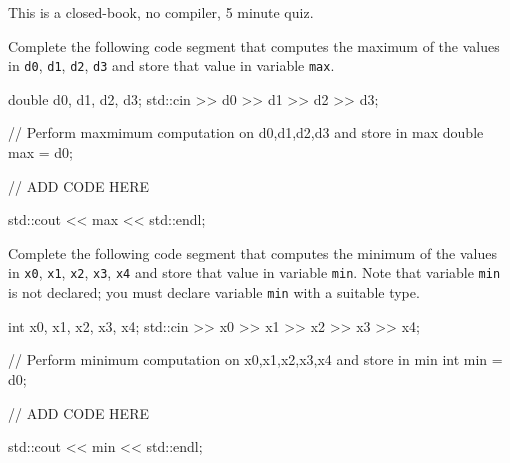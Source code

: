 

This is a closed-book, no compiler, 5 minute quiz.

\nextq
Complete the following code segment that computes the maximum of the values in
\verb!d0!, \verb!d1!, \verb!d2!, \verb!d3!
and store that value in variable \verb!max!.
\\
\ANSWER
\begin{answercode}
double d0, d1, d2, d3;
std::cin >> d0 >> d1 >> d2 >> d3;

// Perform maxmimum computation on d0,d1,d2,d3 and store in max
double max = d0;

// ADD CODE HERE

std::cout << max << std::endl;
\end{answercode}

\nextq
Complete the following code segment that computes the minimum of the values in
\verb!x0!, \verb!x1!, \verb!x2!, \verb!x3!, \verb!x4!
and store that value in variable \verb!min!.
Note that variable \verb!min! is not declared; you must declare variable
\verb!min! with a suitable type.
\\
\ANSWER
\begin{answercode}
int x0, x1, x2, x3, x4;
std::cin >> x0 >> x1 >> x2 >> x3 >> x4;

// Perform minimum computation on x0,x1,x2,x3,x4 and store in min
int min = d0;

// ADD CODE HERE

std::cout << min << std::endl;
\end{answercode}


